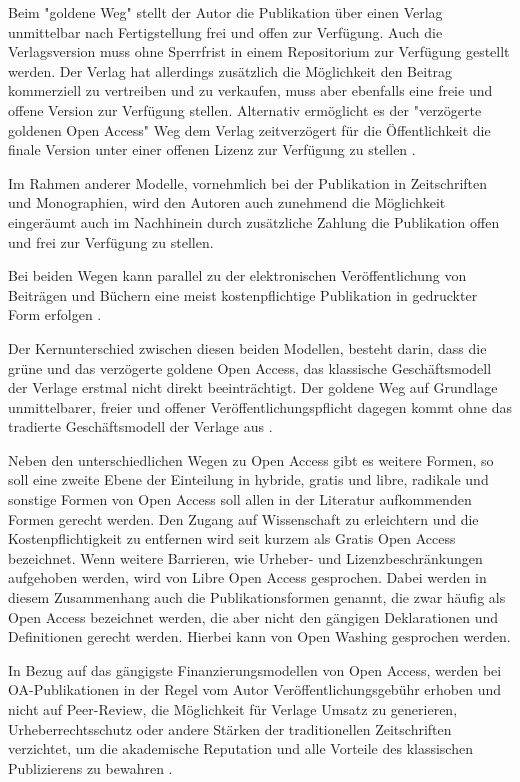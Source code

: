 Beim "goldene Weg" stellt der Autor die Publikation über einen Verlag unmittelbar nach Fertigstellung frei und offen zur Verfügung. Auch die Verlagsversion muss ohne Sperrfrist in einem Repositorium zur Verfügung gestellt werden. Der Verlag hat allerdings zusätzlich die Möglichkeit den Beitrag kommerziell zu vertreiben und zu verkaufen, muss aber ebenfalls eine freie und offene Version zur Verfügung stellen. Alternativ ermöglicht es der "verzögerte goldenen Open Access" Weg dem Verlag zeitverzögert für die Öffentlichkeit die finale Version unter einer offenen Lizenz zur Verfügung zu stellen \cite{lewis_2012_inevitability}. 

Im Rahmen anderer Modelle, vornehmlich bei der Publikation in Zeitschriften und Monographien, wird den Autoren auch zunehmend die Möglichkeit eingeräumt auch im Nachhinein durch zusätzliche Zahlung die Publikation offen und frei zur Verfügung zu stellen\cite{lewis_2012_inevitability}.

Bei beiden Wegen kann parallel zu der elektronischen Veröffentlichung von Beiträgen und Büchern eine meist kostenpflichtige Publikation in gedruckter Form erfolgen \cite{suchen}.

Der Kernunterschied zwischen diesen beiden Modellen, besteht darin, dass die grüne und das verzögerte goldene Open Access, das klassische Geschäftsmodell der Verlage erstmal nicht direkt beeinträchtigt. Der goldene Weg auf Grundlage unmittelbarer, freier und offener Veröffentlichungspflicht dagegen kommt ohne das tradierte Geschäftsmodell der Verlage aus \cite{lewis_2012_inevitability}.

Neben den unterschiedlichen Wegen zu Open Access gibt es weitere Formen, so soll eine zweite Ebene der Einteilung in hybride, gratis und libre, radikale und sonstige Formen von Open Access soll allen in der Literatur aufkommenden Formen gerecht werden. Den Zugang auf Wissenschaft zu erleichtern und die Kostenpflichtigkeit zu entfernen wird seit kurzem als Gratis Open Access bezeichnet. Wenn weitere Barrieren, wie Urheber- und Lizenzbeschränkungen aufgehoben werden, wird von Libre Open Access gesprochen. \cite{Adema_2014_open_access} Dabei werden in diesem Zusammenhang auch die Publikationsformen genannt, die zwar häufig als Open Access bezeichnet werden, die aber nicht den gängigen Deklarationen \cite{boai_2012} und Definitionen gerecht werden. Hierbei kann von Open Washing gesprochen werden. 

In Bezug auf das gängigste Finanzierungsmodellen von Open Access, werden bei OA-Publikationen in der Regel vom Autor Veröffentlichungsgebühr erhoben und nicht auf Peer-Review, die Möglichkeit für Verlage Umsatz zu generieren, Urheberrechtsschutz oder andere Stärken der traditionellen Zeitschriften verzichtet, um die akademische Reputation \cite{albert_2006_open_implications} \cite{Open_Access_net_2009} und alle Vorteile des klassischen Publizierens zu bewahren \cite{Suber_2002}.

